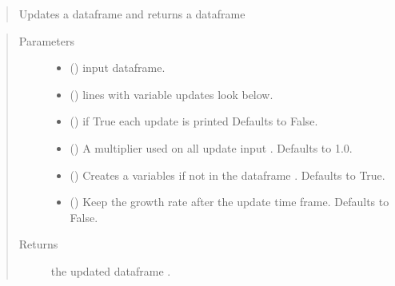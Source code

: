 \documentclass[letterpaper,10pt,english]{sphinxmanual}
\begin{document}
\begin{fulllineitems}
\begin{fulllineitems}
\begin{quote}
\sphinxAtStartPar
Updates a dataframe and returns a dataframe
\end{quote}
\begin{quote}\begin{description}
\item[{Parameters}] \leavevmode\begin{itemize}
\item {} 
\sphinxAtStartPar
{} () \textendash{} input dataframe.

\item {} 
\sphinxAtStartPar
{} () \textendash{} lines with variable updates look below.

\item {} 
\sphinxAtStartPar
{} (\sphinxstyleliteralemphasis{\sphinxupquote{, }}) \textendash{} if True each update is printed  Defaults to False.

\item {} 
\sphinxAtStartPar
{} (\sphinxstyleliteralemphasis{\sphinxupquote{, }}) \textendash{} A multiplier used on all update input . Defaults to 1.0.

\item {} 
\sphinxAtStartPar
{} (\sphinxstyleliteralemphasis{\sphinxupquote{, }}) \textendash{} Creates a variables if not in the dataframe . Defaults to True.

\item {} 
\sphinxAtStartPar
{} (\sphinxstyleliteralemphasis{\sphinxupquote{, }}) \textendash{} Keep the growth rate after the update time frame. Defaults to False.

\end{itemize}

\item[{Returns}] \leavevmode
\sphinxAtStartPar
the updated dataframe .


\end{description}
\end{quote}
\end{fulllineitems}
\end{fulllineitems}
\end{document}
